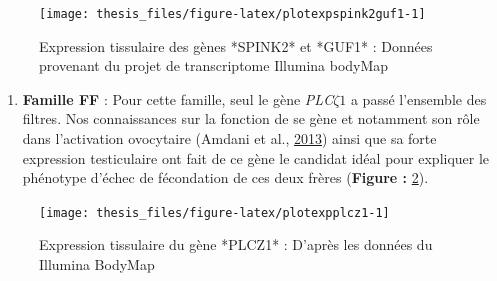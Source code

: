 \documentclass[12pt,twoside]{reedthesis}
\providecommand{\tightlist}{%
  \setlength{\itemsep}{0pt}\setlength{\parskip}{0pt}}
\theoremstyle{definition}
\theoremstyle{definition}
\theoremstyle{remark}
\begin{document}
  \begin{figure}
  
  {\centering \texttt{[image: thesis\_files/figure-latex/plotexpspink2guf1-1]} 
  
  }
  
  \caption[Expression tissulaire des gènes *SPINK2* et *GUF1*]{Expression tissulaire des gènes *SPINK2* et *GUF1* : Données provenant du projet de transcriptome Illumina bodyMap}\label{fig:plotexpspink2guf1}
  \end{figure}
  
  \begin{enumerate}
  \def\labelenumi{\arabic{enumi}.}
  \setcounter{enumi}{1}
  \tightlist
  \item
    \textbf{Famille FF} : Pour cette famille, seul le gène
    \emph{PLC}\(\zeta 1\) a passé l'ensemble des filtres. Nos
    connaissances sur la fonction de se gène et notamment son rôle dans
    l'activation ovocytaire (Amdani et al.,
    \protect\hyperlink{ref-Amdani2013}{2013}) ainsi que sa forte
    expression testiculaire ont fait de ce gène le candidat idéal pour
    expliquer le phénotype d'échec de fécondation de ces deux frères
    (\textbf{Figure : }\ref{fig:plotexpplcz1}).
  \end{enumerate}
  
  \begin{figure}
  
  {\centering \texttt{[image: thesis\_files/figure-latex/plotexpplcz1-1]} 
  
  }
  
  \caption[Expression tissulaire du gène *PLCZ1*]{Expression tissulaire du gène *PLCZ1* : D'après les données du Illumina BodyMap}\label{fig:plotexpplcz1}
  \end{figure}
  
\end{document}
